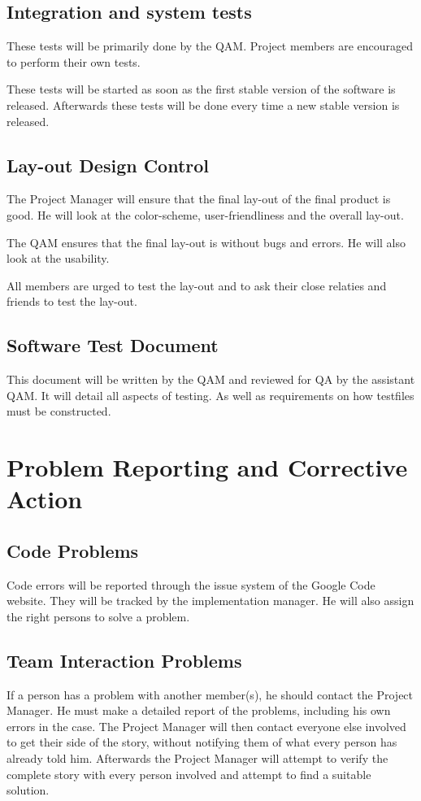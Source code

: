 \documentclass[salesmen, twoside]{../../../templates/latex/2009/softproj}
\begin{document}
\begin{projdoc}
\section{Integration and system tests}
These tests will be primarily done by the QAM. Project members are encouraged to perform their own tests.

These tests will be started as soon as the first stable version of the software is released. Afterwards these tests will be done every time a new stable version is released.

\section{Lay-out Design Control}
The Project Manager will ensure that the final lay-out of the final product is good. He will look at the color-scheme, user-friendliness and the overall lay-out.

The QAM ensures that the final lay-out is without bugs and errors. He will also look at the usability.

All members are urged to test the lay-out and to ask their close relaties and friends to test the lay-out.

\section{Software Test Document}
This document will be written by the QAM and reviewed for QA by the assistant QAM. It will detail all aspects of testing. As well as requirements on how testfiles must be constructed.


\chapter{Problem Reporting and Corrective Action}
\section{Code Problems}
Code errors will be reported through the issue system of the Google Code website. They will be tracked by the implementation manager. He will also assign the right persons to solve a problem.

\section{Team Interaction Problems}
If a person has a problem with another member(s), he should contact the Project Manager. He must make a detailed report of the problems, including his own errors in the case. The Project Manager will then contact everyone else involved to get their side of the story, without notifying them of what every person has already told him. Afterwards the Project Manager will attempt to verify the complete story with every person involved and attempt to find a suitable solution.


\end{projdoc}
\end{document}
